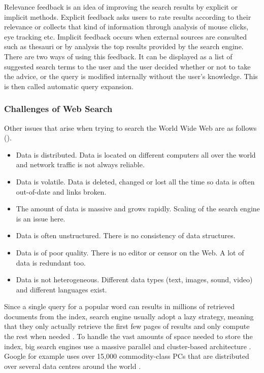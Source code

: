 Relevance feedback is an idea of improving the search results by explicit or implicit methods. Explicit feedback asks users to rate results according to their relevance or collects that kind of information through analysis of mouse clicks, eye tracking etc. Implicit feedback occurs when external sources are consulted such as thesauri or by analysis the top results provided by the search engine. There are two ways of using this feedback. It can be displayed as a list of suggested search terms to the user and the user decided whether or not to take the advice, or the query is modified internally without the user's knowledge. This is then called automatic query expansion.


\subsubsection*{Challenges of Web Search}

Other issues that arise when trying to search the World Wide Web are as follows (\autocite[p.449]{Baeza-Yates2011}).

\begin{itemize}
  \item Data is distributed. Data is located on different computers all over the world and network traffic is not always reliable.
  \item Data is volatile. Data is deleted, changed or lost all the time so data is often out-of-date and links broken.
  \item The amount of data is massive and grows rapidly. Scaling of the search engine is an issue here.
  \item Data is often unstructured. There is no consistency of data structures.
  \item Data is of poor quality. There is no editor or censor on the Web. A lot of data is redundant too.
  \item Data is not heterogeneous. Different data types (text, images, sound, video) and different languages exist.
\end{itemize}

Since a single query for a popular word can results in  millions of retrieved documents from the index, search engine usually adopt a lazy strategy, meaning that they only actually retrieve the first few pages of results and only compute the rest when needed \autocite[p.459]{Baeza-Yates2011}. To handle the vast amounts of space needed to store the index, big search engines use a massive parallel and cluster-based architecture \autocite[p.459]{Baeza-Yates2011}. Google for example uses over 15,000 commodity-class PCs that are distributed over several data centres around the world \autocite{Dean2003}.


